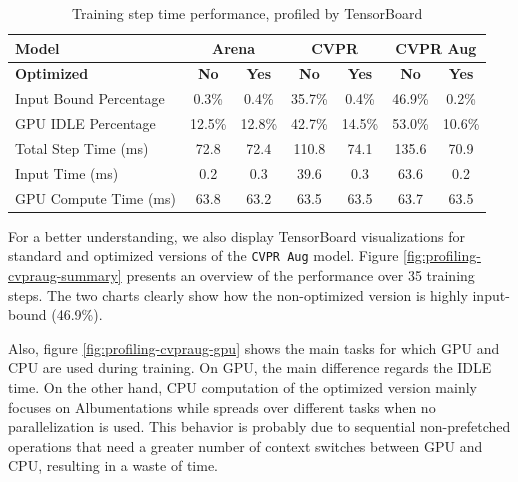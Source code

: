 \begin{table}[H]
	\caption{Training step time performance, profiled by TensorBoard}
	\label{tab:data-generator-profiling}
	\centering
	\begin{tabular}{|l|c|c||c|c||c|c|}
		\hline
		\textbf{Model} & \multicolumn{2}{|c||}{\textbf{Arena}} & \multicolumn{2}{|c||}{\textbf{CVPR}} & \multicolumn{2}{|c|}{\textbf{CVPR Aug}} \\
		\hline
		\textbf{Optimized} & \textbf{No} & \textbf{Yes} & \textbf{No} & \textbf{Yes} & \textbf{No} & \textbf{Yes} \\
		\hline
		Input Bound Percentage      &  0.3\% &  0.4\% & 35.7\% &  0.4\% & 46.9\% &  0.2\% \\
		GPU IDLE Percentage         & 12.5\% & 12.8\% & 42.7\% & 14.5\% & 53.0\% & 10.6\% \\
		\hline
		Total Step Time (ms)        &   72.8 &   72.4 &  110.8 &   74.1 &  135.6 &   70.9 \\
		Input Time (ms)             &    0.2 &    0.3 &   39.6 &    0.3 &   63.6 &    0.2 \\
		GPU Compute Time (ms)       &   63.8 &   63.2 &   63.5 &   63.5 &   63.7 &   63.5 \\
		\hline
	\end{tabular}
\end{table}

For a better understanding, we also display TensorBoard visualizations for standard and optimized versions of the \texttt{CVPR Aug} model. Figure \ref{fig:profiling-cvpraug-summary} presents an overview of the performance over 35 training steps. The two charts clearly show how the non-optimized version is highly input-bound (46.9\%).

Also, figure \ref{fig:profiling-cvpraug-gpu} shows the main tasks for which GPU and CPU are used during training. On GPU, the main difference regards the IDLE time. On the other hand, CPU computation of the optimized version mainly focuses on Albumentations while spreads over different tasks when no parallelization is used. This behavior is probably due to sequential non-prefetched operations that need a greater number of context switches between GPU and CPU, resulting in a waste of time.

